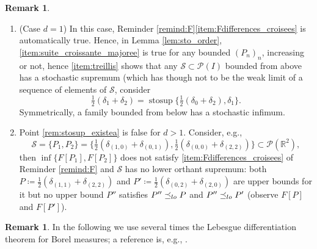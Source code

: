 \documentclass[11pt]{article}
\newcommand{\skpt}{\smallskip}
\theoremstyle{plain}
\theoremstyle{definition}
\newtheorem{rem}[them]{Remark}
\newcommand{\eqdef}{\coloneqq}
\newcommand{\p}{\mathcal{P}}
\newcommand{\R}{\mathbb{R}}
\newcommand{\stosup}{\operatorname{stosup}}
\newcommand{\leqlc}{\preceq_{\rm lo}}
\begin{document}
\skpt
\begin{rem}\label{rem:stosup_existe}
\begin{enumerate}
\item\label{rem:stosup_existea}
(Case $d=1$) In this case, Reminder \ref{remind:F}\eqref{item:Fdifferences_croisees} is automatically true. Hence, in Lemma \ref{lem:sto_order}, \eqref{item:suite_croissante_majoree} is true for any bounded $(P_n)_n$, increasing or not, hence \eqref{item:treillis} shows that any $\mathcal{S}\subset\p(I)$ bounded from above has a stochastic supremum (which has though not to be the weak limit of a sequence of elements of $\mathcal{S}$, consider
\[
\tfrac12(\delta_{1}+\delta_{2})=\stosup\bigl\{\tfrac12(\delta_{0}+\delta_{2}),\delta_{1}\bigr\}.
\]
Symmetrically, a family bounded from below has a stochastic infimum.

\item\label{rem:stosup_existeb}
Point \eqref{rem:stosup_existea} is false for $d>1$. Consider, e.g.,
\[
\mathcal{S}=\{P_1,P_2\}=\bigl\{\tfrac12(\delta_{(1,0)}+\delta_{(0,1)}),\tfrac12(\delta_{(0,0)}+\delta_{(2,2)})\bigr\}\subset\p(\R^2),
\]
then $\inf\{F[P_1],F[P_2]\}$ does not satisfy \eqref{item:Fdifferences_croisees} of Reminder \ref{remind:F} and $\mathcal{S}$ has no lower orthant supremum: both $P\eqdef\frac12(\delta_{(1,1)}+\delta_{(2,2)})$ and $P'\eqdef\frac12(\delta_{(0,2)}+\delta_{(2,0)})$ are upper bounds for it but no upper bound $P''$ satisfies $P''\leqlc P$ and $P''\leqlc P'$ (observe $F[P]$ and $F[P']$).
\end{enumerate}
\end{rem}

\begin{rem}In the following we use several times the Lebesgue differentiation theorem for Borel measures; a reference is, e.g., \cite[\S2.8--2.9]{Fe}.
\end{rem}
\end{document}
